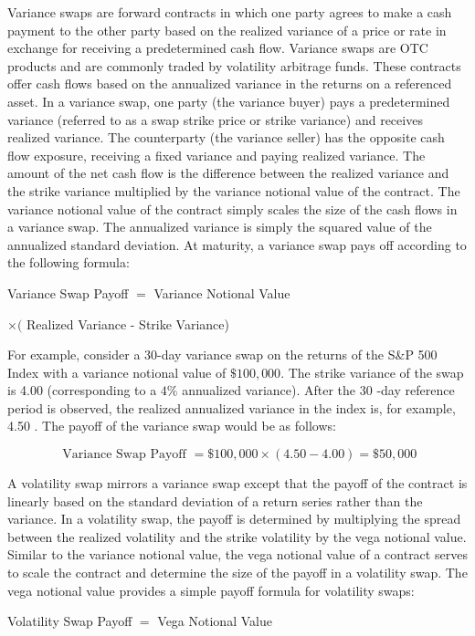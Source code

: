 \documentclass[11pt]{article}
\begin{document}
Variance swaps are forward contracts in which one party agrees to make a cash payment to the other party based on the realized variance of a price or rate in exchange for receiving a predetermined cash flow. Variance swaps are OTC products and are commonly traded by volatility arbitrage funds. These contracts offer cash flows based on the annualized variance in the returns on a referenced asset. In a variance swap, one party (the variance buyer) pays a predetermined variance (referred to as a swap strike price or strike variance) and receives realized variance. The counterparty (the variance seller) has the opposite cash flow exposure, receiving a fixed variance and paying realized variance. The amount of the net cash flow is the difference between the realized variance and the strike variance multiplied by the variance notional value of the contract. The variance notional value of the contract simply scales the size of the cash flows in a variance swap. The annualized variance is simply the squared value of the annualized standard deviation. At maturity, a variance swap pays off according to the following formula:

Variance Swap Payoff $=$ Variance Notional Value

$\times($ Realized Variance - Strike Variance)

For example, consider a 30-day variance swap on the returns of the S\&P 500 Index with a variance notional value of $\$ 100,000$. The strike variance of the swap is 4.00 (corresponding to a $4 \%$ annualized variance). After the 30 -day reference period is observed, the realized annualized variance in the index is, for example, 4.50 . The payoff of the variance swap would be as follows:

$$
\text { Variance Swap Payoff }=\$ 100,000 \times(4.50-4.00)=\$ 50,000
$$

A volatility swap mirrors a variance swap except that the payoff of the contract is linearly based on the standard deviation of a return series rather than the variance. In a volatility swap, the payoff is determined by multiplying the spread between the realized volatility and the strike volatility by the vega notional value. Similar to the variance notional value, the vega notional value of a contract serves to scale the contract and determine the size of the payoff in a volatility swap. The vega notional value provides a simple payoff formula for volatility swaps:

Volatility Swap Payoff $=$ Vega Notional Value
\end{document}
